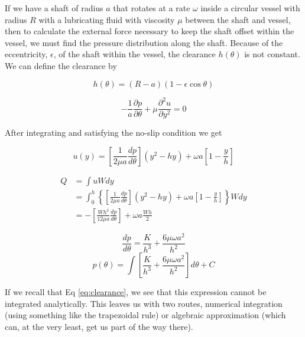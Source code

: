 \documentclass[11pt]{article}
\begin{document}
If we have a shaft of radius $a$ that rotates at a rate $\omega$ inside a circular vessel with radius $R$ with a lubricating fluid with viscosity $\mu$ between the shaft and vessel, then to calculate the external force necessary to keep the shaft offset within the vessel, we must find the pressure distribution along the shaft. Because of the eccentricity, $\epsilon$, of the shaft within the vessel, the clearance $h(\theta)$ is not constant. We can define the clearance by

\begin{equation}
\label{eq:clearance}
	h(\theta) = (R-a)(1-\epsilon\cos\theta)
\end{equation}

\begin{equation}
	-\frac{1}{a}\frac{\partial p}{\partial \theta} 
	+ \mu \frac{\partial^2 u}{\partial y^2} = 0
\end{equation}


After integrating and satisfying the no-slip condition we get

\begin{equation}
	u(y) = \left[\frac{1}{2\mu a}\frac{dp}{d\theta}\right]
	\left(y^2-hy\right)+\omega a \left[1- \frac{y}{h}\right]
\end{equation}

\begin{align}
	Q &= \int uW dy \\
	&= \int_0^h \left\{\left[\frac{1}{2\mu a}\frac{dp}{d\theta}\right]\left(y^2-hy\right)+\omega a \left[1- \frac{y}{h}\right]\right\} Wdy \\
	&= -\left[\frac{Wh^3}{12\mu a}\frac{dp}{d\theta}\right]+\omega a \frac{Wh}{2}
\end{align}

\begin{equation}
	\frac{dp}{d\theta} = \frac{K}{h^3}+\frac{6\mu \omega a^2}{h^2}
\end{equation} 
\begin{equation}
	p(\theta) = \int \left[\frac{K}{h^3}+\frac{6\mu \omega a^2}{h^2} \right]d\theta + C
\end{equation}

If we recall that Eq \ref{eq:clearance}, we see that this expression cannot be integrated analytically. This leaves us with two routes, numerical integration (using something like the trapezoidal rule) or algebraic approximation (which can, at the very least, get us part of the way there).
\end{document}
